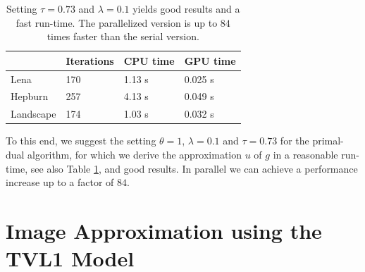 \documentclass[abstracton]{scrreprt}
\begin{document}
            \begin{table}[!ht]
                \centering
                \begin{tabular}{| l || l | l | l |}
                    \hline
                    & Iterations & CPU time & GPU time \\ \hline
                    Lena & 170 & 1.13 s & 0.025 s \\ \hline
                    Hepburn & 257 & 4.13 s & 0.049 s \\ \hline
                    Landscape & 174 & 1.03 s & 0.032 s \\ \hline
                \end{tabular}
                \caption[Run-times for best parameters in ROF model.]{Setting $\tau = 0.73$ and $\lambda = 0.1$ yields good results and a fast run-time. The parallelized version is up to $84$ times faster than the serial version.}
                \label{tab:rof_cpu_vs_gpu}
            \end{table}

        To this end, we suggest the setting $\theta = 1$, $\lambda = 0.1$ and $\tau = 0.73$ for the primal-dual algorithm, for which we derive the approximation $u$ of $g$ in a reasonable run-time, see also Table \ref{tab:rof_cpu_vs_gpu}, and good results. In parallel we can achieve a performance increase up to a factor of $84$.

    \section{Image Approximation using the TVL1 Model} %
    \label{sec:image_approximation_using_the_tvl1_model}
\end{document}
